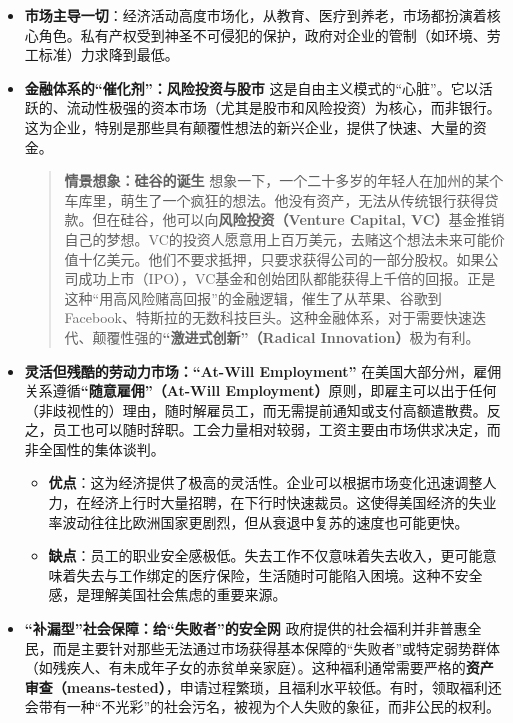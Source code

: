 \begin{itemize}
\item \textbf{市场主导一切}：经济活动高度市场化，从教育、医疗到养老，市场都扮演着核心角色。私有产权受到神圣不可侵犯的保护，政府对企业的管制（如环境、劳工标准）力求降到最低。
\item \textbf{金融体系的“催化剂”：风险投资与股市}
这是自由主义模式的“心脏”。它以活跃的、流动性极强的资本市场（尤其是股市和风险投资）为核心，而非银行。这为企业，特别是那些具有颠覆性想法的新兴企业，提供了快速、大量的资金。
\begin{quote}
\textbf{情景想象：硅谷的诞生}
想象一下，一个二十多岁的年轻人在加州的某个车库里，萌生了一个疯狂的想法。他没有资产，无法从传统银行获得贷款。但在硅谷，他可以向\textbf{风险投资（Venture Capital, VC）}基金推销自己的梦想。VC的投资人愿意用上百万美元，去赌这个想法未来可能价值十亿美元。他们不要求抵押，只要求获得公司的一部分股权。如果公司成功上市（IPO），VC基金和创始团队都能获得上千倍的回报。正是这种“用高风险赌高回报”的金融逻辑，催生了从苹果、谷歌到Facebook、特斯拉的无数科技巨头。这种金融体系，对于需要快速迭代、颠覆性强的\textbf{“激进式创新”（Radical Innovation）}极为有利。
\end{quote}
\item \textbf{灵活但残酷的劳动力市场：“At-Will Employment”}
在美国大部分州，雇佣关系遵循\textbf{“随意雇佣”（At-Will Employment）}原则，即雇主可以出于任何（非歧视性的）理由，随时解雇员工，而无需提前通知或支付高额遣散费。反之，员工也可以随时辞职。工会力量相对较弱，工资主要由市场供求决定，而非全国性的集体谈判。
\begin{itemize}
\item \textbf{优点}：这为经济提供了极高的灵活性。企业可以根据市场变化迅速调整人力，在经济上行时大量招聘，在下行时快速裁员。这使得美国经济的失业率波动往往比欧洲国家更剧烈，但从衰退中复苏的速度也可能更快。
\item \textbf{缺点}：员工的职业安全感极低。失去工作不仅意味着失去收入，更可能意味着失去与工作绑定的医疗保险，生活随时可能陷入困境。这种不安全感，是理解美国社会焦虑的重要来源。
\end{itemize}
\item \textbf{“补漏型”社会保障：给“失败者”的安全网}
政府提供的社会福利并非普惠全民，而是主要针对那些无法通过市场获得基本保障的“失败者”或特定弱势群体（如残疾人、有未成年子女的赤贫单亲家庭）。这种福利通常需要严格的\textbf{资产审查（means-tested）}，申请过程繁琐，且福利水平较低。有时，领取福利还会带有一种“不光彩”的社会污名，被视为个人失败的象征，而非公民的权利。
\end{itemize}

